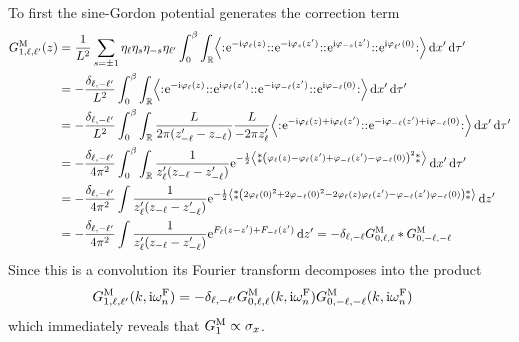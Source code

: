 \documentclass[english, parskip=full]{scrartcl}
\begin{document}
To first the sine-Gordon potential generates the correction term
\begin{align}
G_{1,\ell,\ell'}^\M(z) &= \frac{1}{L^2} \sum_{s=\pm 1} \eta_\ell \eta_s \eta_{-s} \eta_{\ell'} \intx{0}{\beta}{\intr{\bra*{\normord{\powe{-\i\varphi_\ell(z)}}\normord{\powe{-\i\varphi_s(z')}} \normord{\powe{\i\varphi_{-s}(z')}} \normord{\powe{\i\varphi_{\ell'}(0)}}}}{x'} }{\tau'}\\
&= -\frac{\delta_{\ell,-\ell'}}{L^2} \intx{0}{\beta}{\intr{\bra*{\normord{\powe{-\i\varphi_\ell(z)}}  \normord{\powe{\i\varphi_{\ell}(z')}} \normord{\powe{-\i\varphi_{-\ell}(z')}} \normord{\powe{\i\varphi_{-\ell}(0)}}}}{x'} }{\tau'} \\
&= -\frac{\delta_{\ell,-\ell'}}{L^2} \intx{0}{\beta}{\intr{ \frac{L}{2\pi (z_{-\ell}' - z_{-\ell})} \frac{L}{-2\pi z_\ell'} \bra*{\normord{\powe{-\i\varphi_\ell(z)+\i\varphi_{\ell}(z')}} \normord{\powe{-\i\varphi_{-\ell}(z')+\i\varphi_{-\ell}(0)}}}}{x'} }{\tau'} \\
&= -\frac{\delta_{\ell,-\ell'}}{4\pi^2} \intx{0}{\beta}{\intr{\frac{1}{z_\ell' (z_{-\ell} - z_{-\ell}')} \powe{-\frac{1}{2} \bra*{\varnormord{\kla*{\varphi_{\ell}(z) - \varphi_{\ell}(z') + \varphi_{-\ell}(z') - \varphi_{-\ell}(0)}^2} } }}{x'} }{\tau'}\\
&= -\frac{\delta_{\ell,-\ell'}}{4\pi^2} \int \frac{1}{z_\ell' (z_{-\ell} - z_{-\ell}')} \powe{-\frac{1}{2} \bra*{\varnormord{\kla*{2\varphi_\ell(0)^2 + 2\varphi_{-\ell}(0)^2 - 2\varphi_{\ell}(z)\varphi_{\ell}(z') - \varphi_{-\ell}(z') \varphi_{-\ell}(0)}}}} \,\d z'\\
&= -\frac{\delta_{\ell,-\ell'}}{4\pi^2} \int \frac{1}{z_\ell' (z_{-\ell} - z_{-\ell}')} \powe{F_\ell(z-z') + F_{-\ell}(z')} \,\d z' = -\delta_{\ell,-\ell} G_{0,\ell,\ell}^\M \ast G_{0,-\ell,-\ell}^\M
\end{align}
Since this is a convolution its Fourier transform decomposes into the product
\begin{align}
G_{1,\ell,\ell'}^{\text{M}}(k,\text{i}\omega_n^{\text{F}}) &= -\delta_{\ell,-\ell'} G_{0,\ell,\ell}^{\text{M}}(k,\text{i}\omega_n^{\text{F}}) G_{0,-\ell,-\ell}^{\text{M}}(k,\text{i}\omega_n^{\text{F}})
\end{align}
which immediately reveals that $G_1^{\text{M}}\propto \sigma_x$.
\end{document}
